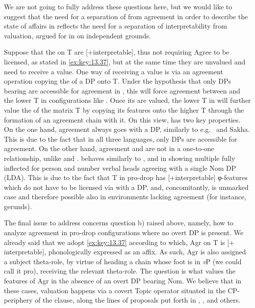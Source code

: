 \documentclass[output=paper]{langsci/langscibook}
\begin{document}
\begin{exe}
We are not going to fully address these questions here, but we would like to
suggest that the need for a separation of  from agreement in order
to describe the state of affairs in  reflects the need for a
separation of interpretability from valuation, argued for in
\citet{PesetskyTorrego2007} on independent grounds.

Suppose that the  on T are [+interpretable], thus not requiring
Agree to be licensed, as stated in \eqref{ex:key:13.37}, but at the same time
they are unvalued and need to receive a value. One way of receiving a value is
via an agreement operation copying the  of a DP onto T. Under the
hypothesis that only DPs bearing \Nom{} are accessible for agreement in ,
this will force agreement between \Nom{} and the lower T in configurations like
. Once its  are valued, the lower T in 
will further value the  of the matrix T by copying its features
onto the higher T through the formation of an agreement chain with it. On this
view,  has two key properties. On the one hand, agreement always goes with
a \Nom{} DP, similarly to e.g.\  and Sakha. This is due to the fact that in
all three languages, only \Nom{} DPs are accessible for agreement. On the other
hand, agreement and \Nom{} are not in a one-to-one relationship, unlike
 and .  behaves similarly to ,
and  in showing multiple fully inflected for person and number verbal heads
agreeing with a single Nom DP (\gls{LDA}). This is due to the
fact that T in pro-drop  has [+interpretable] φ-features which do
not have to be licensed via  with a \Nom{} DP, and, concomitantly,
\Nom{} is unmarked case and therefore possible also in environments lacking
agreement (for instance, gerunds).

The final issue to address concerns question b) raised above, namely, how to
analyze agreement in pro-drop configurations where no overt DP is present. We
already said that we adopt \eqref{ex:key:13.37} according to which, Agr on T is
[+ interpretable], phonologically expressed as an affix. As such, Agr is also
assigned a subject theta-role, by virtue of heading a chain whose foot is in
\emph{v}P (we could call it pro), receiving the relevant theta-role. The
question is what values the features of Agr in the absence of an overt DP
bearing Nom. We believe that in these cases, valuation happens via a covert
Topic operator situated in the CP-periphery of the clause, along the lines of
proposals put forth in \citet{Frascarelli2007}, \citet{FraHin2007},
\citet{Miyagawa2017} and others.


\end{exe}
\end{document}
